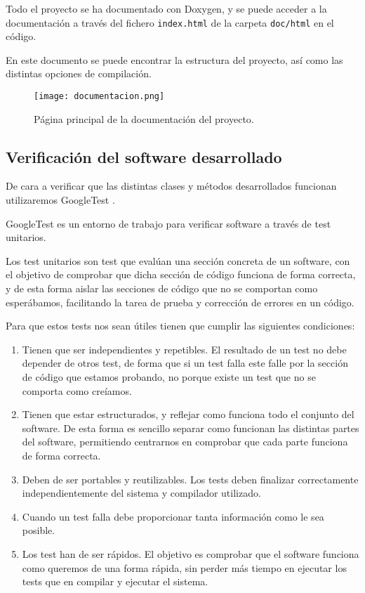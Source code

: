 Todo el proyecto se ha documentado con Doxygen, y se puede acceder a la documentación a través del fichero \texttt{index.html} de la carpeta \texttt{doc/html} en el código.

En este documento se puede encontrar la estructura del proyecto, así como las distintas opciones de compilación.

\begin{figure}[H]
	 \centering
	 \texttt{[image: documentacion.png]}
	 \caption{Página principal de la documentación del proyecto.}
	\label{fig:documentación}
\end{figure}

\newpage

\subsection{Verificación del software desarrollado}

De cara a verificar que las distintas clases y métodos desarrollados funcionan utilizaremos GoogleTest \cite{gtest}.

GoogleTest es un entorno de trabajo para verificar software a través de test unitarios.

Los test unitarios son test que evalúan una sección concreta de un software, con el objetivo de comprobar que dicha sección de código funciona de forma correcta, y de esta forma aislar las secciones de código que no se comportan como esperábamos, facilitando la tarea de prueba y corrección de errores en un código.

Para que estos tests nos sean útiles tienen que cumplir las siguientes condiciones:

\begin{enumerate}
	\item Tienen que ser independientes y repetibles. El resultado de un test no debe depender de otros test, de forma que si un test falla este falle por la sección de código que estamos probando, no porque existe un test que no se comporta como creíamos.
	\item Tienen que estar estructurados, y reflejar como funciona todo el conjunto del software. De esta forma es sencillo separar como funcionan las distintas partes del software, permitiendo centrarnos en comprobar que cada parte funciona de forma correcta.
	\item Deben de ser portables y reutilizables. Los tests deben finalizar correctamente independientemente del sistema y compilador utilizado.
	\item Cuando un test falla debe proporcionar tanta información como le sea posible.
	\item Los test han de ser rápidos. El objetivo es comprobar que el software funciona como queremos de una forma rápida, sin perder más tiempo en ejecutar los tests que en compilar y ejecutar el sistema.
\end{enumerate}

